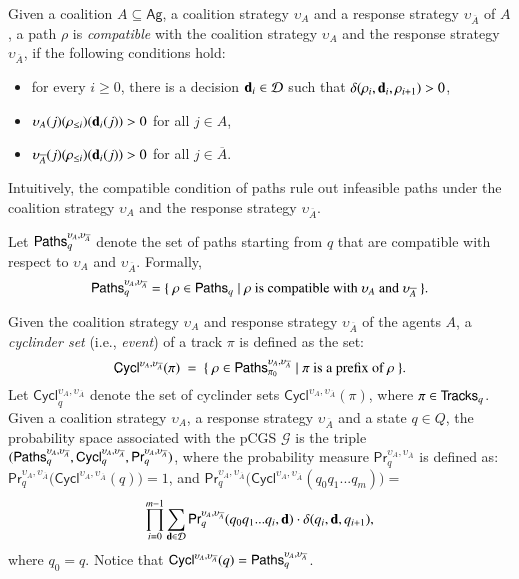 \documentclass[letterpaper]{article}
\newcommand{\calM}{\mathcal{G}}
\newcommand{\calD}{\mathcal{D}}
\newcommand{\calP}{{\sf Paths}}
\newcommand{\calT}{{\sf Tracks}}
\newcommand{\Ag}{\textsf{Ag}}
\newcommand{\Cycl}{\textsf{Cycl}}
\newcommand{\Prb}{\textsf{Pr}}
\newcommand{\nA}{\overline{A}}
\newcommand{\dec}{{\bf d}}
\begin{document}
Given a coalition $A\subseteq\Ag$, a coalition strategy $\upsilon_A$ and a response strategy $\upsilon_{\nA}$ of $A$,
a path $\rho$ is \emph{compatible} with the coalition strategy $\upsilon_A$ and the response strategy $\upsilon_{\nA}$, if the following conditions hold:
\begin{itemize}
  \item for every $i\geq 0$, there is a decision $\dec_i\in \calD$ such that $\delta(\rho_i,\dec_i,\rho_{i+1})>0$,
  \item $\upsilon_A(j)(\rho_{\leq i})(\dec_i(j))>0$ for all $j\in A$,
  \item $\upsilon_{\nA}(j)(\rho_{\leq i})(\dec_i(j))>0$ for all $j\in \nA$.
\end{itemize}
Intuitively, the compatible condition of paths rule out infeasible paths under the coalition strategy $\upsilon_A$ and the response strategy $\upsilon_{\nA}$.

Let $\calP_q^{\upsilon_A,\upsilon_{\nA}}$
denote the set of paths starting from $q$ that are compatible with respect to $\upsilon_A$ and $\upsilon_{\nA}$.
Formally, \[\calP_q^{\upsilon_A,\upsilon_{\nA}}=\{ \ \rho\in \calP_q \mid \rho \mbox{ is compatible with } \upsilon_A \mbox{ and } \upsilon_{\nA} \ \}.\]

Given the coalition strategy $\upsilon_A$ and response strategy $\upsilon_{\nA}$ of the agents $A$, a \emph{cyclinder set} (i.e., \emph{event}) of a track $\pi$ is defined as the set:
\[\Cycl^{\upsilon_A,\upsilon_{\nA}}(\pi) \ = \ \{ \ \rho\in \calP_{\pi_0}^{\upsilon_A,\upsilon_{\nA}}\mid \pi \mbox{ is a prefix of }\rho \ \}.\]
Let $\Cycl_q^{\upsilon_A,\upsilon_{\nA}}$ denote the set of cyclinder sets $\Cycl^{\upsilon_A,\upsilon_{\nA}}(\pi)$, where $\pi\in \calT_q$.
Given a coalition strategy $\upsilon_A$,  a response strategy $\upsilon_{\nA}$ and a state $q\in Q$, the probability space associated with the pCGS $\calM$ is the triple
$(\calP_q^{\upsilon_A,\upsilon_{\nA}}, \Cycl_q^{\upsilon_A,\upsilon_{\nA}}, \Prb_q^{\upsilon_A,\upsilon_{\nA}})$,
where the probability measure $\Prb_q^{\upsilon_A,\upsilon_{\nA}}$ is defined as: $\Prb_q^{\upsilon_A,\upsilon_{\nA}}\big(\Cycl^{\upsilon_A,\upsilon_{\nA}}(q)\big)=1$, and
$\Prb_q^{\upsilon_A,\upsilon_{\nA}}\big(\Cycl^{\upsilon_A,\upsilon_{\nA}}(q_0q_1...q_m)\big)=$
\[\prod_{i=0}^{m-1} \sum_{\dec\in\calD} \Prb_q^{\upsilon_A,\upsilon_{\nA}}(q_0q_1...q_i,\dec)\cdot \delta(q_{i},\dec,q_{i+1}),\]
where $q_0=q$. Notice that $\Cycl^{\upsilon_A,\upsilon_{\nA}}(q)=\calP_q^{\upsilon_A,\upsilon_{\nA}}$.
\end{document}
